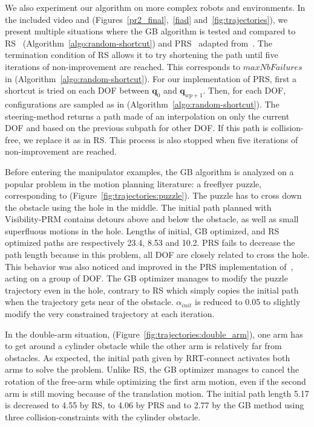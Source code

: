 \documentclass{tADR2e}
\newcommand\conf{\mathbf{q}}
\begin{document}
We also experiment our algorithm on more complex robots and environments.
In the included video and (Figures~\ref{pr2_final},~\ref{fiad} 
and~\ref{fig:trajectories}), we present multiple situations where the GB algorithm 
is tested and compared to RS~\cite{randomShortcutHPP}
(Algorithm~\ref{algo:random-shortcut}) and PRS~\cite{partialrandomShortcutHPP} 
adapted from~\cite{Geraerts04clearancebased}.
The termination condition of RS allows it to try 
shortening the path until five iterations of non-improvement are reached. 
This corresponds to $maxNbFailures$ in (Algorithm~\ref{algo:random-shortcut}).
For our implementation of PRS, first a shortcut is tried on each DOF between 
$\conf_0$ and $\conf_{wp+1}$. 
Then, for each DOF, configurations are sampled as in 
(Algorithm~\ref{algo:random-shortcut}). The steering-method returns a path made of 
an interpolation on only 
the current DOF and based on the previous subpath for other DOF. If this path is 
collision-free, we replace it as in RS. This process is also stopped when five 
iterations of non-improvement are reached.

\vspace{0.4cm}
Before entering the manipulator examples, the GB algorithm is analyzed 
on a popular problem in the motion planning literature: a freeflyer puzzle, 
corresponding to (Figure~\ref{fig:trajectories:puzzle}). The 
puzzle has to cross down the 
obstacle using the hole in the middle. The initial path planned with Visibility-PRM 
contains detours above and below the obstacle, as well as small superfluous
motions in the hole. 
Lengths of initial, GB optimized, and RS optimized paths are 
respectively 23.4, 8.53 and 10.2. PRS fails to decrease the path length because in 
this problem, all DOF are closely related to cross the hole. This behavior was also 
noticed and improved in the PRS implementation of~\cite{Geraerts04clearancebased}, 
acting on a group of DOF. The GB optimizer manages to modify the puzzle trajectory 
even in the hole, contrary to RS which simply copies the initial path when the 
trajectory gets near of the obstacle. $\alpha_{init}$ is reduced to 0.05 to slightly modify the very constrained trajectory at each iteration.

\vspace{0.4cm}

In the double-arm situation, (Figure~\ref{fig:trajectories:double_arm}), one arm has 
to get around a cylinder obstacle while the 
other arm is relatively far from obstacles. As expected, the initial path given by 
RRT-connect activates both arms to solve the problem. Unlike RS, 
the GB optimizer manages to cancel the rotation of the free-arm while optimizing the 
first arm motion, even if the second arm is still moving because of the translation 
motion. The initial path length 5.17 is decreased to 4.55 by RS, to 4.06 by PRS and 
to 2.77 by the GB method using three collision-constraints with the cylinder obstacle.
\end{document}
